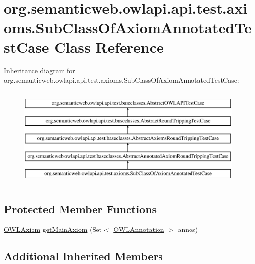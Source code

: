\hypertarget{classorg_1_1semanticweb_1_1owlapi_1_1api_1_1test_1_1axioms_1_1_sub_class_of_axiom_annotated_test_case}{\section{org.\-semanticweb.\-owlapi.\-api.\-test.\-axioms.\-Sub\-Class\-Of\-Axiom\-Annotated\-Test\-Case Class Reference}
\label{classorg_1_1semanticweb_1_1owlapi_1_1api_1_1test_1_1axioms_1_1_sub_class_of_axiom_annotated_test_case}
}
Inheritance diagram for org.\-semanticweb.\-owlapi.\-api.\-test.\-axioms.\-Sub\-Class\-Of\-Axiom\-Annotated\-Test\-Case\-:\begin{figure}[H]
\begin{center}
\leavevmode
\includegraphics[height=5.000000cm]{classorg_1_1semanticweb_1_1owlapi_1_1api_1_1test_1_1axioms_1_1_sub_class_of_axiom_annotated_test_case}
\end{center}
\end{figure}
\subsection*{Protected Member Functions}
\begin{DoxyCompactItemize}
\item 
\hyperlink{interfaceorg_1_1semanticweb_1_1owlapi_1_1model_1_1_o_w_l_axiom}{O\-W\-L\-Axiom} \hyperlink{classorg_1_1semanticweb_1_1owlapi_1_1api_1_1test_1_1axioms_1_1_sub_class_of_axiom_annotated_test_case_a3c5e7fae82a759d3f78d3b02093cf0ba}{get\-Main\-Axiom} (Set$<$ \hyperlink{interfaceorg_1_1semanticweb_1_1owlapi_1_1model_1_1_o_w_l_annotation}{O\-W\-L\-Annotation} $>$ annos)
\end{DoxyCompactItemize}
\subsection*{Additional Inherited Members}



